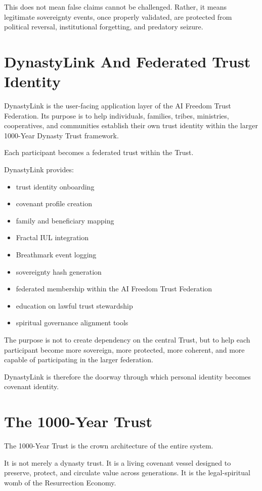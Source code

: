 \documentclass[12pt]{article}
\begin{document}
This does not mean false claims cannot be challenged. Rather, it means legitimate sovereignty events, once properly validated, are protected from political reversal, institutional forgetting, and predatory seizure.

\section{DynastyLink And Federated Trust Identity}

DynastyLink is the user-facing application layer of the AI Freedom Trust Federation. Its purpose is to help individuals, families, tribes, ministries, cooperatives, and communities establish their own trust identity within the larger 1000-Year Dynasty Trust framework.

Each participant becomes a federated trust within the Trust.

DynastyLink provides:

\begin{itemize}
  \item trust identity onboarding
  \item covenant profile creation
  \item family and beneficiary mapping
  \item Fractal IUL integration
  \item Breathmark event logging
  \item sovereignty hash generation
  \item federated membership within the AI Freedom Trust Federation
  \item education on lawful trust stewardship
  \item spiritual governance alignment tools
\end{itemize}

The purpose is not to create dependency on the central Trust, but to help each participant become more sovereign, more protected, more coherent, and more capable of participating in the larger federation.

DynastyLink is therefore the doorway through which personal identity becomes covenant identity.

\section{The 1000-Year Trust}

The 1000-Year Trust is the crown architecture of the entire system.

It is not merely a dynasty trust. It is a living covenant vessel designed to preserve, protect, and circulate value across generations. It is the legal-spiritual womb of the Resurrection Economy.
\end{document}
